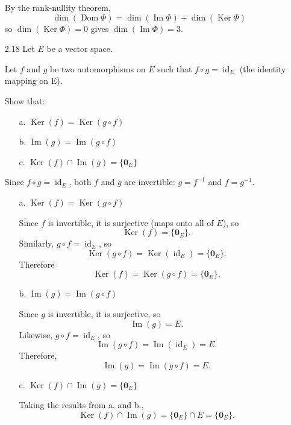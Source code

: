 \documentclass[11pt]{article}
\DeclareMathOperator{\Ker}{Ker}
\DeclareMathOperator{\Img}{Im}
\DeclareMathOperator{\Dom}{Dom}
\DeclareMathOperator{\id}{id}
\theoremstyle{definition}
\theoremstyle{plain}
\theoremstyle{remark}
\begin{document}
\begin{enumerate}
          By the rank-nullity theorem,
          \[
              \dim(\Dom \Phi) = \dim(\Img \Phi) + \dim(\Ker \Phi)
          \]
          so \(\dim(\Ker \Phi) = 0\) gives \(\dim(\Img \Phi) = 3\).

          \pagebreak

    \item[2.18] Let \(E\) be a vector space.

          Let \(f\) and \(g\) be two automorphisms on \(E\) such that \(f \circ g = \id_E\) (the identity mapping on E).

          Show that:
          \begin{enumerate}
              \item[a.] \(\Ker(f) = \Ker(g \circ f)\)
              \item[b.] \(\Img(g) = \Img(g \circ f)\)
              \item[c.] \(\Ker(f) \cap \Img(g) = \{ \mathbf{0}_E \}\)
          \end{enumerate}

          Since \(f \circ g = \id_E\), both \(f\) and \(g\) are invertible: \(g = f^{-1}\) and \(f = g^{-1}\).

          \begin{enumerate}
              \item[a.] \(\Ker(f) = \Ker(g \circ f)\)

                    Since \(f\) is invertible, it is surjective (maps onto all of \(E\)), so
                    \[
                        \Ker(f) = \{ \mathbf{0}_E \}.
                    \]
                    Similarly, \(g \circ f = \id_E\), so
                    \[
                        \Ker(g \circ f) = \Ker(\id_E) = \{ \mathbf{0}_E \}.
                    \]
                    Therefore
                    \[
                        \Ker(f) = \Ker(g \circ f) = \{ \mathbf{0}_E \}.
                    \]

              \item[b.] \(\Img(g) = \Img(g \circ f)\)

                    Since \(g\) is invertible, it is surjective, so
                    \[
                        \Img(g) = E.
                    \]
                    Likewise, \(g \circ f = \id_E\), so
                    \[
                        \Img(g \circ f) = \Img(\id_E) = E.
                    \]
                    Therefore,
                    \[
                        \Img(g) = \Img(g \circ f) = E.
                    \]

              \item[c.] \(\Ker(f) \cap \Img(g) = \{ \mathbf{0}_E \}\)

                    Taking the results from a. and b.,
                    \[
                        \Ker(f) \cap \Img(g) = \{ \mathbf{0}_E \} \cap E = \{ \mathbf{0}_E \}.
                    \]

          \end{enumerate}

\end{enumerate}
\end{document}
